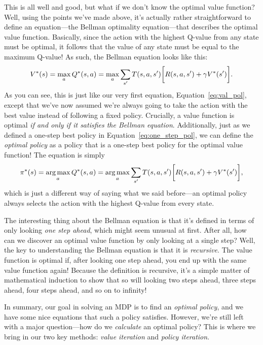 \documentclass[a4paper]{article}
\begin{document}
This is all well and good, but what if we don't know the optimal value function?
Well, using the points we've made above, it's actually rather straightforward
to define an equation---the Bellman optimality equation---that describes the
optimal value function.
Basically, since the action with the highest Q-value from any state must be
optimal, it follows that the value of any state must be equal to the maximum
Q-value!
As such, the Bellman equation looks like this:
\begin{equation} \label{eq:bellman}
  V^*(s) = \operatorname*{max}_a Q^*(s, a) = \operatorname*{max}_a \sum_{s'} T(s, a, s') \bigg[ R(s, a, s') + \gamma V^*(s') \bigg] .
\end{equation}
As you can see, this is just like our very first equation,
Equation~\ref{eq:val_pol}, except that we've now assumed we're always going
to take the action with the best value instead of following a fixed policy.
Crucially, a value function is optimal
\emph{if and only if it satisfies the Bellman equation}.
Additionally, just as we defined a one-step best policy in
Equation~\ref{eq:one_step_pol},
we can define the \emph{optimal policy} as a policy that is a one-step best
policy for the optimal value function!
The equation is simply
\begin{equation} \label{eq:optimal_pol}
  \pi^*(s) = \operatorname*{arg\,max}_a Q^*(s, a) = \operatorname*{arg\,max}_a \sum_{s'} T(s, a, s') \bigg[ R(s, a, s') + \gamma V^*(s') \bigg] ,
\end{equation}
which is just a different way of saying what we said before---an optimal policy
always selects the action with the highest Q-value from every state.

The interesting thing about the Bellman equation is that it's defined in terms
of only looking \emph{one step ahead},
which might seem unusual at first.
After all, how can we discover an optimal value function by only looking at
a single step?
Well, the key to understanding the Bellman equation is that it is
\emph{recursive}.
The value function is optimal if, after looking one step ahead, you end up
with the same value function again!
Because the definition is recursive, it's a simple matter of mathematical
induction to show that so will looking two steps ahead, three steps ahead,
four steps ahead, and so on to infinity!

In summary, our goal in solving an MDP is to find an \emph{optimal policy}, and
we have some nice equations that such a policy satisfies.
However, we're still left with a major question---how do we \emph{calculate}
an optimal policy?
This is where we bring in our two key methods:
\emph{value iteration} and \emph{policy iteration}.
\end{document}

